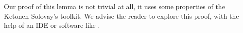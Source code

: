 


Our proof of this lemma is not trivial at all, it uses some properties of the Ketonen-Solovay's toolkit. We advise the reader to explore this proof, with the help of an IDE or software like \alectr.













  
